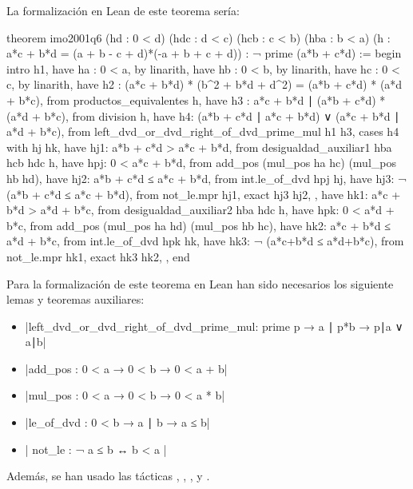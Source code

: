 La formalización en Lean de este teorema sería:
\begin{leancode}
theorem imo2001q6
  (hd  : 0 < d)
  (hdc : d < c)
  (hcb : c < b)
  (hba : b < a)
  (h : a*c + b*d = (a + b - c + d)*(-a + b + c + d))
  : ¬ prime (a*b + c*d) :=
begin
  intro h1,
  have ha : 0 < a,
    by linarith,
  have hb : 0 < b,
    by linarith,
  have hc : 0 < c,
    by linarith,
  have h2 : (a*c + b*d) * (b^2 + b*d + d^2) =
            (a*b + c*d) * (a*d + b*c),
    from productos_equivalentes h,
  have h3 : a*c + b*d ∣ (a*b + c*d) * (a*d + b*c),
    from division h,
  have h4: (a*b + c*d ∣ a*c + b*d) ∨ (a*c + b*d  ∣ a*d + b*c),
    from left_dvd_or_dvd_right_of_dvd_prime_mul h1 h3,
  cases h4 with hj hk,
  { have hj1: a*b + c*d > a*c + b*d,
      from desigualdad_auxiliar1 hba hcb hdc h,
    have hpj: 0 < a*c + b*d,
      from add_pos (mul_pos ha hc) (mul_pos hb hd),
    have hj2: a*b + c*d ≤ a*c + b*d,
      from int.le_of_dvd hpj hj,
    have hj3: ¬ (a*b + c*d ≤ a*c + b*d),
      from not_le.mpr hj1,
    exact hj3 hj2, },
  { have hk1: a*c + b*d > a*d + b*c,
      from desigualdad_auxiliar2 hba hdc h,
    have hpk: 0 < a*d + b*c,
      from add_pos (mul_pos ha hd) (mul_pos hb hc),
    have hk2: a*c + b*d ≤ a*d + b*c,
      from int.le_of_dvd hpk hk,
    have hk3: ¬ (a*c+b*d ≤  a*d+b*c),
      from not_le.mpr hk1,
    exact hk3 hk2, },
end
\end{leancode}

Para la formalización de este teorema en Lean han sido necesarios los
siguiente lemas y teoremas auxiliares:
\begin{itemize}
\item {}|left_dvd_or_dvd_right_of_dvd_prime_mul: prime p → a ∣ p*b → p∣a ∨ a∣b|
\item {}|add_pos : 0 < a → 0 < b → 0 < a + b|
\item {}|mul_pos : 0 < a → 0 < b → 0 < a * b|
\item {}|le_of_dvd : 0 < b → a ∣ b → a ≤ b|
\item {}| not_le : ¬ a ≤ b ↔ b < a |
\end{itemize}

Además, se han usado las tácticas
,
,
,
 y
.

